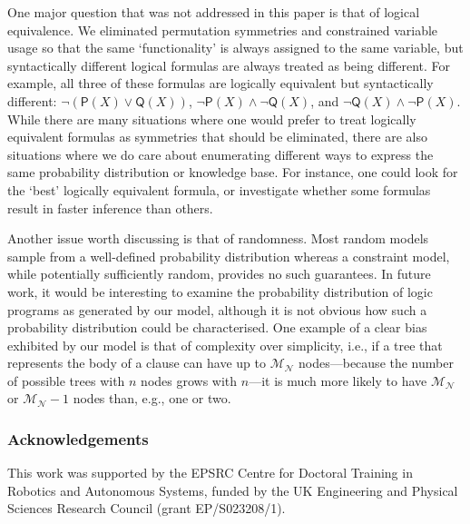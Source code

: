 \documentclass[letterpaper]{article}
\theoremstyle{definition}
\newcommand{\maxNumNodes}{\mathcal{M}_{\mathcal{N}}}
\begin{document}

One major question that was not addressed in this paper is that of logical
equivalence. We eliminated permutation symmetries and constrained variable usage
so that the same `functionality' is always assigned to the same variable, but
syntactically different logical formulas are always treated as being different.
For example, all three of these formulas are logically equivalent but
syntactically different: $\neg(\mathsf{P}(X) \lor \mathsf{Q}(X))$,
$\neg\mathsf{P}(X) \land \neg\mathsf{Q}(X)$, and $\neg\mathsf{Q}(X) \land
\neg\mathsf{P}(X)$. While there are many situations where one would prefer to
treat logically equivalent formulas as symmetries that should be eliminated,
there are also situations where we do care about enumerating different ways to
express the same probability distribution or knowledge base. For instance,
one could look for the `best' logically equivalent formula, or investigate
whether some formulas result in faster inference than others.

Another issue worth discussing is that of randomness. Most random models sample
from a well-defined probability distribution whereas a constraint model, while
potentially sufficiently random, provides no such guarantees. In future work, it
would be interesting to examine the probability distribution of logic programs
as generated by our model, although it is not obvious how such a
probability distribution could be characterised. One example of a clear bias
exhibited by our model is that of complexity over simplicity, i.e., if a tree
that represents the body of a clause can have up to $\maxNumNodes{}$
nodes---because the number of possible trees with $n$ nodes grows with $n$---it
is much more likely to have $\maxNumNodes{}$ or $\maxNumNodes{} - 1$ nodes than,
e.g., one or two.

\subsubsection*{Acknowledgements}

This work was supported by the EPSRC Centre for Doctoral Training in Robotics
and Autonomous Systems, funded by the UK Engineering and Physical Sciences
Research Council (grant EP/S023208/1).

\newpage

\renewcommand{\bibsection}{\subsubsection*{References}}

\end{document}
